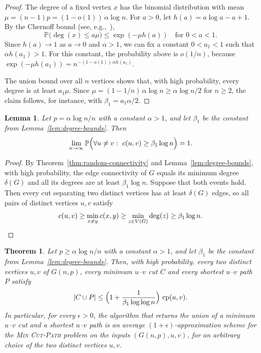 \documentclass[a4paper,fleqn]{cas-sc}
\numberwithin{equation}{section}
\theoremstyle{definition}
\theoremstyle{plain}
\newtheorem{theorem}[definition]{Theorem}
\newtheorem{lemma}[definition]{Lemma}
\theoremstyle{remark}
\newcommand{\cp}{\operatorname{cp}}                  %
\newcommand{\MinCutPath}{\textsc{Min Cut-Path}}
\begin{document}
\begin{proof}
The degree of a fixed vertex $x$ has the binomial distribution with mean $\mu = (n-1)p = (1-o(1))\,\alpha \log n$.
For $a > 0$, let $h(a) = a \log a - a + 1$.
By the Chernoff bound (see, e.g.,~\cite[Eq.~(21.19)]{Frieze2016}),
\[
\mathbb{P}\bigl(\deg(x) \leq a\mu\bigr) \leq \exp(-\mu h(a)) \quad \text{for } 0 < a < 1.
\]
Since $h(a) \to 1$ as $a \to 0$ and $\alpha > 1$, we can fix a constant $0 < a_1 < 1$ such that $\alpha h(a_1) > 1$.
For this constant, the probability above is $o(1/n)$, because $\exp(-\mu h(a_1)) = n^{-(1-o(1))\,\alpha h(a_1)}$.

The union bound over all $n$ vertices shows that, with high probability, every degree is at least $a_1 \mu$.
Since $\mu = (1 - 1/n)\,\alpha \log n \geq \alpha \log n / 2$ for $n \geq 2$, the claim follows, for instance, with $\beta_1 = a_1 \alpha / 2$.
\end{proof}

\begin{lemma}
\label{lem:connectivity-bounds}
Let $p = \alpha \log n / n$ with a constant $\alpha > 1$, and let $\beta_1$ be the constant from Lemma~\ref{lem:degree-bounds}.
Then
\[
\lim_{n\to\infty} \mathbb{P}\Bigl( \forall u \neq v: \ c(u,v) \geq \beta_1 \log n \Bigr) = 1.
\]
\end{lemma}

\begin{proof}
By Theorem~\ref{thm:random-connectivity} and Lemma~\ref{lem:degree-bounds}, with high probability, the edge connectivity of $G$ equals its minimum degree $\delta(G)$ and all its degrees are at least $\beta_1 \log n$.
Suppose that both events hold.
Then every cut separating two distinct vertices has at least $\delta(G)$ edges, so all pairs of distinct vertices $u, v$ satisfy
\[
c(u, v) \geq \min_{x \neq y} c(x, y) \geq \min_{z \in V(G)} \deg(z) \geq \beta_1 \log n. \qedhere
\]
\end{proof}

\begin{theorem}
\label{thm:approximation-scheme}
Let $p \geq \alpha \log n / n$ with a constant $\alpha > 1$, and let $\beta_1$ be the constant from Lemma~\ref{lem:degree-bounds}.
Then, with high probability, every two distinct vertices $u, v$ of $G(n, p)$, every minimum $u$--$v$ cut $C$ and every shortest $u$--$v$ path $P$ satisfy
\[
|C \cup P| \leq \Bigl(1 + \frac{1}{\beta_1 \log \log n}\Bigr)\, \cp(u, v).
\]
In particular, for every $\epsilon > 0$, the algorithm that returns the union of a minimum $u$--$v$ cut and a shortest $u$--$v$ path is an average $(1+\epsilon)$-approximation scheme for the \MinCutPath{} problem on the inputs $(G(n, p), u, v)$, for an arbitrary choice of the two distinct vertices $u, v$.
\end{theorem}
\end{document}
